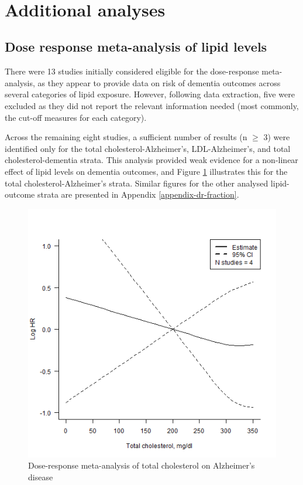 \documentclass[a4paper, twoside]{templates/ociamthesis}
\begin{document}
~

\hypertarget{additional-analyses-1}{%
\section{Additional analyses}\label{additional-analyses-1}}

\hypertarget{dose-response-results}{%
\subsection{Dose response meta-analysis of lipid levels}\label{dose-response-results}}

There were 13 studies initially considered eligible for the dose-response meta-analysis, as they appear to provide data on risk of dementia outcomes across several categories of lipid exposure. However, following data extraction, five were excluded as they did not report the relevant information needed (most commonly, the cut-off measures for each category).

Across the remaining eight studies, a sufficient number of results (n \(\geqslant\) 3) were identified only for the total cholesterol-Alzheimer's, LDL-Alzheimer's, and total cholesterol-dementia strata. This analysis provided weak evidence for a non-linear effect of lipid levels on dementia outcomes, and Figure \ref{fig:lipidsDoseResponse} illustrates this for the total cholesterol-Alzheimer's strata. Similar figures for the other analysed lipid-outcome strata are presented in Appendix \ref{appendix-dr-fraction}.





\begin{figure}[H]

{\centering \includegraphics[width=0.7\linewidth]{figures/sys-rev/dr_AD_TC} 

}

\caption[Dose-response meta-analysis of total cholesterol]{Dose-response meta-analysis of total cholesterol on Alzheimer's disease}\label{fig:lipidsDoseResponse}
\end{figure}
\end{document}
